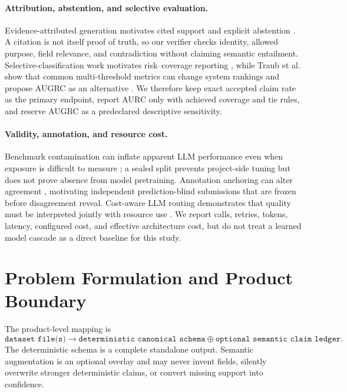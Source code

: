 \documentclass[11pt]{article}
\begin{document}
\paragraph{Attribution, abstention, and selective evaluation.}
Evidence-attributed generation motivates cited support and explicit abstention
\cite{menick2022verifiedquotes,gao2023rarr}. A citation is not itself proof of
truth, so our verifier checks identity, allowed purpose, field relevance, and
contradiction without claiming semantic entailment. Selective-classification work
motivates risk--coverage reporting \cite{geifman2017selective}, while Traub et al.
show that common multi-threshold metrics can change system rankings and propose
AUGRC as an alternative \cite{traub2024selective}. We therefore keep exact accepted
claim rate as the primary endpoint, report AURC only with achieved coverage and
tie rules, and reserve AUGRC as a predeclared descriptive sensitivity.

\paragraph{Validity, annotation, and resource cost.}
Benchmark contamination can inflate apparent LLM performance even when exposure
is difficult to measure \cite{sainz2023contamination}; a sealed split prevents
project-side tuning but does not prove absence from model pretraining. Annotation
anchoring can alter agreement \cite{berzak2016anchoring}, motivating independent
prediction-blind submissions that are frozen before disagreement reveal.
Cost-aware LLM routing demonstrates that quality must be interpreted jointly with
resource use \cite{chen2023frugalgpt}. We report calls, retries, tokens, latency,
configured cost, and effective architecture cost, but do not treat a learned model
cascade as a direct baseline for this study.

\section{Problem Formulation and Product Boundary}

The product-level mapping is
\[
  \texttt{dataset file(s)} \longrightarrow
  \texttt{deterministic canonical schema} \oplus
  \texttt{optional semantic claim ledger}.
\]
The deterministic schema is a complete standalone output. Semantic augmentation is
an optional overlay and may never invent fields, silently overwrite stronger
deterministic claims, or convert missing support into confidence.
\end{document}

